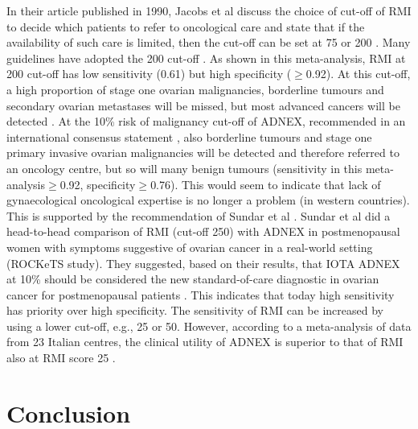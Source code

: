 In their article published in 1990, Jacobs et al discuss the choice of cut-off of
\gls{RMI} to decide which patients to refer to oncological care and state that if the
availability of such care is limited, then the cut-off can be set at 75 or 200
 \cite{jacobsRiskMalignancyIndex1990}. Many guidelines have adopted the 200 cut-off
 \cite{OvarianMassesPremenopausal2016a,AggstockscancerMedEpitelial2023,staer-jensenBenigneCysterOvarienea,HandteringAfOvariecyster2016,OvarianCystsPostmenopausal2016,sundarRiskpredictionModelsPostmenopausal2024}.
As shown in this meta-analysis, \gls{RMI} at 200 cut-off has low sensitivity (0.61) but
high specificity ($\geq$0.92). At this cut-off, a high proportion of stage one
ovarian malignancies, borderline tumours and secondary ovarian metastases will be
missed, but most advanced cancers will be detected
 \cite{vanholsbekeExternalValidationDiagnostic2012}. At the 10\% risk of malignancy
cut-off of \gls{ADNEX}, recommended in an international consensus statement
 \cite{timmermanESGOISUOGIOTA2021}, also borderline tumours and stage one primary
invasive ovarian malignancies will be detected and therefore referred to an oncology
centre, but so will many benign tumours (sensitivity in this
meta-analysis$\geq$0.92, specificity$\geq$0.76). This would seem to indicate that
lack of gynaecological oncological expertise is no longer a problem (in western
countries). This is supported by the recommendation of Sundar et al
 \cite{sundarRiskpredictionModelsPostmenopausal2024}. Sundar et al did a
head-to-head comparison of \gls{RMI} (cut-off 250) with \gls{ADNEX} in postmenopausal women
with symptoms suggestive of ovarian cancer in a real-world setting (ROCKeTS study).
They suggested, based on their results, that \gls{IOTA} \gls{ADNEX} at 10\% should be considered
the new standard-of-care diagnostic in ovarian cancer for postmenopausal patients
 \cite{sundarRiskpredictionModelsPostmenopausal2024}. This indicates that today high
sensitivity has priority over high specificity. The sensitivity of \gls{RMI} can be
increased by using a lower cut-off, e.g., 25 or 50. However, according to a
meta-analysis of data from 23 Italian centres, the clinical utility of \gls{ADNEX} is
superior to that of \gls{RMI} also at \gls{RMI} score 25
 \cite{moroExternalValidationUltrasoundbased2025}.

\section{Conclusion}

